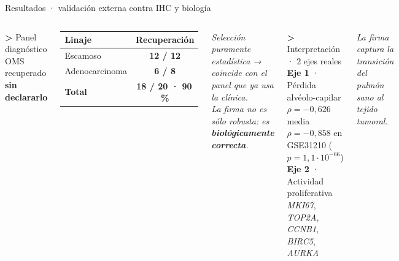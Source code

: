 \documentclass[aspectratio=169, 11pt]{beamer}
\newcommand{\gene}[1]{\textit{#1}}
\newcommand{\kicker}[1]{{\ttfamily\small\color{verdeTerm}\textbf{>} #1}}
\begin{document}
\begin{frame}{Resultados · validación externa contra IHC y biología}
  \vspace{0.2cm}
  \begin{columns}[T]
    \kicker{Panel diagnóstico OMS recuperado \textbf{sin declararlo}}\\[0.3cm]

    \begin{center}\small
      \begin{tabular}{@{}lc@{}}
        \toprule
        \textbf{Linaje} & \textbf{Recuperación} \\
        \midrule
        Escamoso        & \color{verdeTerm}\textbf{12 / 12} \\
        Adenocarcinoma  & \color{verdeTerm}\textbf{6 / 8} \\
        \midrule
        \textbf{Total}  & \color{verdeTerm}\textbf{18 / 20 · 90\,\%} \\
        \bottomrule
      \end{tabular}
    \end{center}

    \vspace{0.35cm}
    {\small\itshape\color{verdeOsc}Selección puramente estadística
    → coincide con el panel que ya usa la clínica.\\
    La firma no es sólo robusta: es \textbf{biológicamente correcta}.}

    \kicker{Interpretación · 2 ejes reales}\\[0.3cm]

    \textbf{Eje 1} · Pérdida alvéolo-capilar\\
    $\rho = -0{,}626$ media\\
    $\rho = -0{,}858$ en GSE31210 ($p=1{,}1\!\cdot\!10^{-66}$)\\[0.35cm]

    \textbf{Eje 2} · Actividad proliferativa\\
    {\small\gene{MKI67}, \gene{TOP2A}, \gene{CCNB1},
    \gene{BIRC5}, \gene{AURKA}}\\[0.4cm]

    \begin{center}\itshape\small\color{verdeOsc}
    La firma captura la transición\\
    del pulmón sano al tejido tumoral.
    \end{center}
  \end{columns}
\end{frame}
\end{document}
